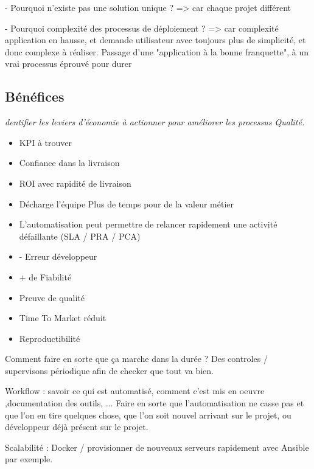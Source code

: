 
- Pourquoi n'existe pas une solution unique ? => car chaque projet différent 

- Pourquoi complexité des processus de déploiement ? => car complexité application en hausse, et demande utilisateur avec toujours plus de simplicité, et donc complexe à réaliser. Passage d'une "application à la bonne franquette", à un vrai processus éprouvé pour durer

\subsection*{Bénéfices}


\textit{dentifier les leviers d’économie à actionner pour améliorer les processus Qualité.}

\begin{itemize}
	\item KPI à trouver
	\item Confiance dans la livraison
	\item ROI avec rapidité de livraison
	\item Décharge l'équipe
	\subitem Plus de temps pour de la valeur métier
	\item L'automatisation peut permettre de relancer rapidement une activité défaillante (SLA / PRA / PCA)
\end{itemize}

\begin{itemize}
	\item - Erreur développeur
	\item + de Fiabilité
	\item Preuve de qualité
	\item Time To Market réduit
	\item Reproductibilité
\end{itemize}

Comment faire en sorte que ça marche dans la durée ? Des controles / supervisons périodique afin de checker que tout va bien.

Workflow : savoir ce qui est automatisé, comment c'est mis en oeuvre ,documentation des outils, ...
Faire en sorte que l'automatisation ne casse pas et que l'on en tire quelques chose, que l'on soit nouvel arrivant sur le projet, ou développeur déjà présent sur le projet.

Scalabilité : Docker / provisionner de nouveaux serveurs rapidement avec Ansible par exemple.

